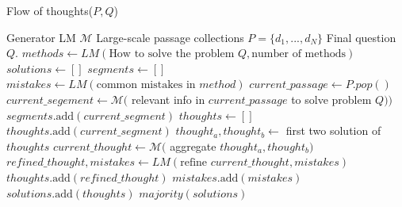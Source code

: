 \documentclass{article}
\begin{document}
\begin{algorithm}
    \caption{Flow of thoughts($P,Q$)}\label{alg:cap}
    \begin{algorithmic}
        \Require Generator LM $\mathcal{M}$
        \Require Large-scale passage collections $P=\{d_1, . . . , d_N \}$
        \Require Final question $Q$.
        \State $methods\gets LM(\text{How to solve the problem } Q, \text{number of methods})$
        \State $solutions\gets []$
            \State $segments \gets []$
            \State $mistakes\gets LM(\text{common mistakes in } method)$
                    \State $current\_passage\gets P.pop()$
                    \State $current\_segement\gets \mathcal{M}($ relevant info in $current\_passage$ to solve problem $Q))$
                    \State $segments.\text{add}(current\_segment)$
                \EndIf
            \EndWhile
            \State $thoughts\gets[]$
                \State $thoughts.\text{add}(current\_segment)$
            \EndFor
                \State $thought_a,thought_b\gets$ first two solution of $thoughts$
                \State $current\_thought\gets\mathcal{M}($ aggregate $thought_a,thought_b)$ 
                \State $refined\_thought,mistakes\gets LM(\text{refine } current\_thought, mistakes)$
                \State $thoughts.\text{add}(refined\_thought)$
                \State $mistakes.\text{add}(mistakes)$
            \EndWhile
            \State $solutions.\text{add}(thoughts)$
        \EndFor
        \State \Return $majority(solutions)$

        
    \end{algorithmic}
    \end{algorithm}
\end{document}
